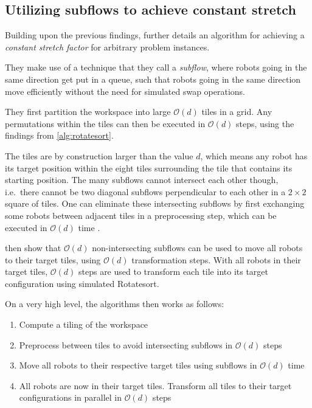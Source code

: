 
\subsection{Utilizing subflows to achieve constant stretch}

Building upon the previous findings, \cite{siamcomp/DemaineFKMS19} further details an algorithm for achieving a \emph{constant stretch factor} for arbitrary problem instances.

They make use of a technique that they call a \emph{subflow}, where robots going in the same direction get put in a queue, such that robots going in the same direction move efficiently without the need for simulated swap operations.

They first partition the workspace into large \(\mathcal O (d)\) tiles in a grid.
Any permutations within the tiles can then be executed in \(\mathcal O (d)\) steps, using the findings from \cref{alg:rotatesort}.

The tiles are by construction larger than the value \(d\), which means any robot has its target position within the eight tiles surrounding the tile that contains its starting position.
The many subflows cannot intersect each other though, i.e.~there cannot be two diagonal subflows perpendicular to each other in a \(2 \times 2\) square of tiles.
One can eliminate these intersecting subflows by first exchanging some robots between adjacent tiles in a preprocessing step, which can be executed in \(\mathcal{O}(d)\) time \cite{siamcomp/DemaineFKMS19}.

\cite{siamcomp/DemaineFKMS19} then show that \(\mathcal{O}(d)\) non-intersecting subflows can be used to move all robots to their target tiles, using \(\mathcal{O}(d)\) transformation steps.
With all robots in their target tiles, \(\mathcal{O}(d)\) steps are used to transform each tile into its target configuration using simulated Rotatesort.

On a very high level, the algorithms then works as follows:
\begin{enumerate}
	\item Compute a tiling of the workspace
	\item Preprocess between tiles to avoid intersecting subflows in \(\mathcal{O}(d)\) steps
	\item Move all robots to their respective target tiles using subflows in \(\mathcal{O}(d)\) time
	\item All robots are now in their target tiles. Transform all tiles to their target configurations in parallel in \(\mathcal{O}(d)\) steps
\end{enumerate}




